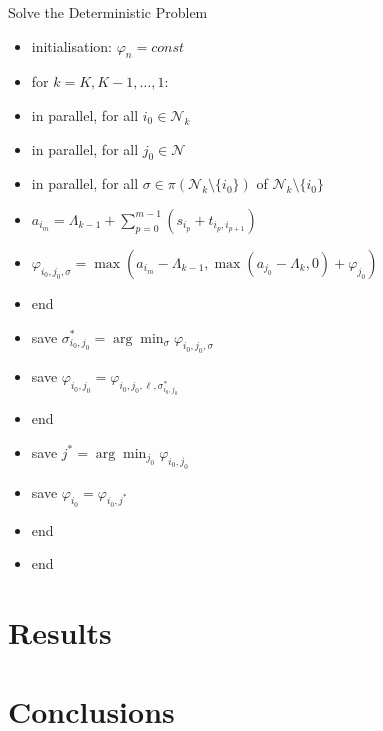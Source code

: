 \begin{algorithm}{Solve the Deterministic Problem}{}
	\label{alg:PrescientDynamic}
	\begin{itemize}
		\item[] initialisation: $\varphi_n = const$
		\item[] for $k=K, K-1, \ldots, 1:$
		\item[] \quad in parallel, for all $i_0\in{\mathcal N}_k$
		\item[] \quad\quad in parallel, for all $j_0\in{\mathcal N}$
		\item[] \quad\quad\quad in parallel, for all $\sigma\in\pi(\mathcal{N}_k \setminus\{i_0\})$ of ${\mathcal N}_k\setminus\{i_0\}$
		\item[] \quad\quad\quad\quad $a_{i_m}=\Lambda_{k-1}+\sum_{p=0}^{m-1}\left(s_{i_p}+t_{i_{p},i_{p+1}}\right)$
		\item[] \quad\quad\quad\quad $\varphi_{i_0,j_0,\sigma}=\max(a_{i_m}-\Lambda_{k-1}, \max(a_{j_0} - \Lambda_k,0) + \varphi_{j_0})$
		\item[] \quad\quad\quad end
		\item[] \quad\quad\quad save $\sigma^*_{i_0,j_0}=\arg\min_{\sigma}\varphi_{i_0,j_0,\sigma}$
		\item[] \quad\quad\quad save $\varphi_{i_0,j_0}=\varphi_{i_0,j_0,\ell,\sigma^*_{i_0,j_0}}$
		\item[] \quad\quad end
		\item[] \quad save $j^* = \arg\min_{j_0} \varphi_{i_0,j_0}$
		\item[] \quad save $\varphi_{i_0} = \varphi_{i_0, j^*}$
		\item[] \quad end
		\item[] end
	\end{itemize}
\end{algorithm}

\section{Results}
\section{Conclusions}